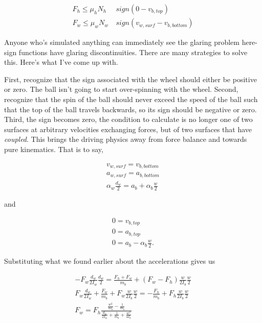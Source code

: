 \documentclass[10pt,letterpaper]{article}
\begin{document}
	\begin{align}
		F_h \leq \mu_h N_h \ & sign(0 - v_{b,top}) \\
		F_w \leq \mu_w N_w \ & sign(v_{w,surf} - v_{b,bottom})
	\end{align}

	Anyone who's simulated anything can immediately see the glaring problem here- sign functions have glaring discontinuities. There are many strategies to solve this. Here's what I've come up with.

	First, recognize that the sign associated with the wheel should either be positive or zero. The ball isn't going to start over-spinning with the wheel.
	Second, recognize that the spin of the ball should never exceed the speed of the ball such that the top of the ball travels backwards, so its sign should be negative or zero.
	Third, the sign becomes zero, the condition to calculate is no longer one of two surfaces at arbitrary velocities exchanging forces, but of two surfaces that have \textit{coupled}. This brings the driving physics away from force balance and towards pure kinematics. That is to say,

	\begin{align}
		v_{w,surf} = v_{b,bottom} \nonumber \\
		a_{w,surf} = a_{b,bottom} \nonumber \\
		\alpha_{w} \frac{d_w}{2} = a_{b} + \alpha_{b} \frac{w}{2}
	\end{align}

	and

	\begin{align}
		0 = v_{b,top} \nonumber \\
		0 = a_{b,top} \nonumber \\
		0 = a_{b} - \alpha_{b} \frac{w}{2} .
	\end{align}

	Substituting what we found earlier about the accelerations gives us

	\begin{align}
		- F_w \frac{d_w}{2 I_w} \frac{d_w}{2} = \frac{F_h + F_w}{m_b} + (F_w - F_h) \frac{w}{2 I_b} \frac{w}{2} \nonumber \\
		F_w \frac{d_w}{2 I_w} + \frac{F_w}{m_b} + F_w \frac{w}{2 I_b} \frac{w}{2} = - \frac{F_h}{m_b} + F_h \frac{w}{2 I_b} \frac{w}{2} \nonumber \\
		F_w = F_h \frac{\frac{w^2}{4 I_b} - \frac{1}{m_b}}{\frac{d_w}{2 I_w} + \frac{1}{m_b} + \frac{w^2}{4 I_b}}
	\end{align}
\end{document}

